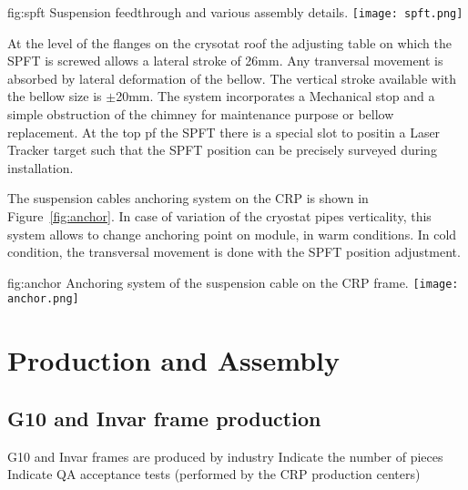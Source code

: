 \begin{dunefigure}{fig:spft}
{Suspension feedthrough and various assembly details.}
\texttt{[image: spft.png]}
\end{dunefigure}

At the level of the flanges on the crysotat roof the adjusting table on which the SPFT is screwed allows a lateral stroke of 26mm. Any tranversal movement is absorbed by lateral deformation of the bellow.
The vertical stroke available with the bellow size is $\pm$20mm.
The system incorporates a  Mechanical stop and a simple obstruction of the chimney for maintenance purpose or bellow replacement.
At the top pf the SPFT there is a special slot to positin a  Laser Tracker target
such that the SPFT position can be precisely surveyed during installation.

The suspension cables anchoring system on the CRP is shown in Figure~\ref{fig:anchor}. 
In case of variation of the cryostat pipes verticality, this system allows to change anchoring point on module, in warm conditions. In cold condition, the transversal movement is done with the SPFT position adjustment.
\begin{dunefigure}{fig:anchor}
{Anchoring system of the suspension cable on the CRP frame.}
\texttt{[image: anchor.png]}
\end{dunefigure}


\section{Production and Assembly}
\label{sec:fddp-crp-prod-assy}

\subsection{G10 and Invar frame production}
\label{sec:fddp-crp-frame}
G10 and Invar frames are produced by industry
Indicate the number of pieces
Indicate QA acceptance tests (performed by the CRP production centers)

